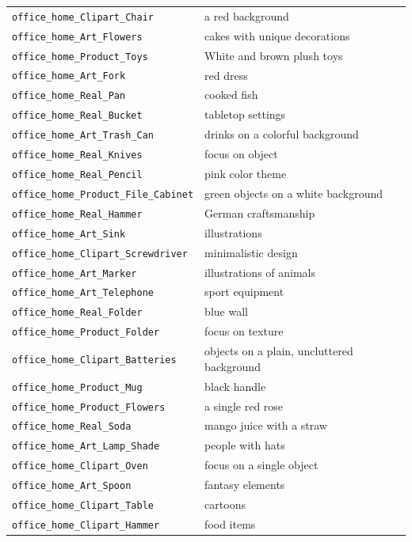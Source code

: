 \documentclass{article} %
\begin{document}
\begin{longtable}{p{} p{}}
\texttt{office\_home\_Clipart\_Chair} & a red background \\
\texttt{office\_home\_Art\_Flowers} & cakes with unique decorations \\
\texttt{office\_home\_Product\_Toys} & White and brown plush toys \\
\texttt{office\_home\_Art\_Fork} & red dress \\
\texttt{office\_home\_Real\_Pan} & cooked fish \\
\texttt{office\_home\_Real\_Bucket} & tabletop settings \\
\texttt{office\_home\_Art\_Trash\_Can} & drinks on a colorful background \\
\texttt{office\_home\_Real\_Knives} & focus on object \\
\texttt{office\_home\_Real\_Pencil} & pink color theme \\
\texttt{office\_home\_Product\_File\_Cabinet} & green objects on a white background \\
\texttt{office\_home\_Real\_Hammer} & German craftsmanship \\
\texttt{office\_home\_Art\_Sink} & illustrations \\
\texttt{office\_home\_Clipart\_Screwdriver} & minimalistic design \\
\texttt{office\_home\_Art\_Marker} & illustrations of animals \\
\texttt{office\_home\_Art\_Telephone} & sport equipment \\
\texttt{office\_home\_Real\_Folder} & blue wall \\
\texttt{office\_home\_Product\_Folder} & focus on texture \\
\texttt{office\_home\_Clipart\_Batteries} & objects on a plain, uncluttered background \\
\texttt{office\_home\_Product\_Mug} & black handle \\
\texttt{office\_home\_Product\_Flowers} & a single red rose \\
\texttt{office\_home\_Real\_Soda} & mango juice with a straw \\
\texttt{office\_home\_Art\_Lamp\_Shade} & people with hats \\
\texttt{office\_home\_Clipart\_Oven} & focus on a single object \\
\texttt{office\_home\_Art\_Spoon} & fantasy elements \\
\texttt{office\_home\_Clipart\_Table} & cartoons \\
\texttt{office\_home\_Clipart\_Hammer} & food items \\

\end{longtable}
\end{document}
